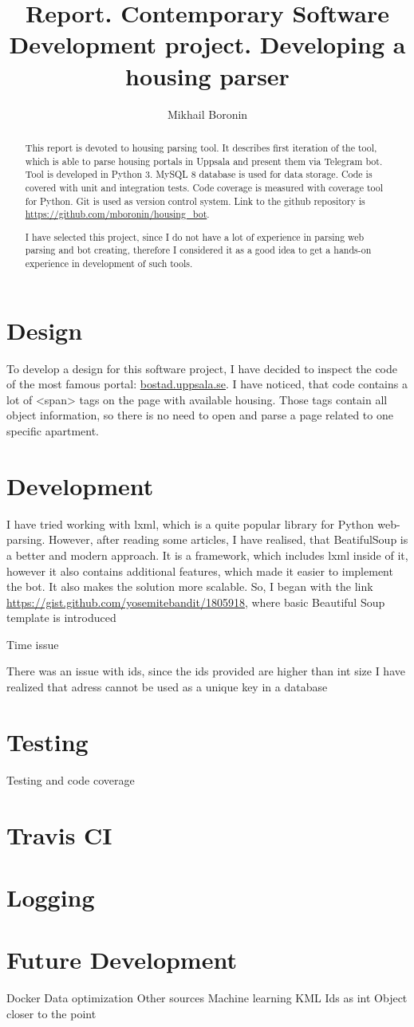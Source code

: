 \documentclass[a4paper,11pt]{article}
\title{Report. Contemporary Software Development project. Developing a housing parser}
\author{Mikhail Boronin}
\begin{document}
\maketitle
\tableofcontents

\begin{abstract}
This report is devoted to housing parsing tool. It describes first iteration of the tool, which is able to parse housing portals in Uppsala and present them via Telegram bot.
Tool is developed in Python 3. MySQL 8 database is used for data storage. 
Code is covered with unit and integration tests. Code coverage is measured with coverage tool for Python.
Git is used as version control system. Link to the github repository is \url{https://github.com/mboronin/housing_bot}.

I have selected this project, since I do not have a lot of experience in parsing web parsing and bot creating, therefore I considered it as a good idea to get a hands-on experience in development of such tools.
\end{abstract}

\section{Design}
To develop a design for this software project, I have decided to inspect the code of the most famous portal: \url{bostad.uppsala.se}. I have noticed, that code contains a lot of <span> tags on the page with available housing. Those tags contain all object information, so there is no need to open and parse a page related to one specific apartment.


\section{Development}
I have tried working with lxml, which is a quite popular library for Python web-parsing.
However, after reading some articles, I have realised, that BeatifulSoup is a better and modern approach. It is a framework, which includes lxml inside of it, however it also contains additional features, which made it easier to implement the bot. It also makes the solution more scalable.
So, I began with the link \url{https://gist.github.com/yosemitebandit/1805918}, where basic Beautiful Soup template is introduced

Time issue

There was an issue with ids, since the ids provided are higher than int size
I have realized that adress cannot be used as a unique key in a database

\section{Testing}
Testing and code coverage

\section{Travis CI}

\section{Logging}

\section{Future Development}
Docker
Data optimization
Other sources
Machine learning
KML
Ids as int
Object closer to the point
\end{document}

